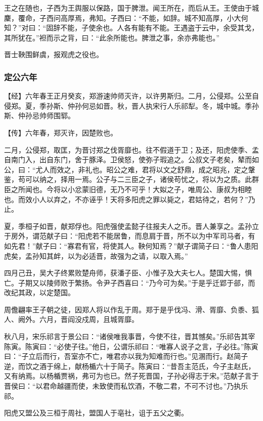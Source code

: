 \documentclass[]{article}
\begin{document}
王之在随也，子西为王舆服以保路，国于脾泄。闻王所在，而后从王。王使由于城麇，覆命，子西问高厚焉，弗知。子西曰：``不能，如辞。城不知高厚，小大何知？''对曰：``固辞不能，子使余也。人各有能有不能。王遇盗于云中，余受其戈，其所犹在。''袒而示之背，曰：``此余所能也。脾泄之事，余亦弗能也。''

晋士鞅围鲜虞，报观虎之役也。

\hypertarget{header-n2933}{%
\subsubsection{定公六年}\label{header-n2933}}

【经】六年春王正月癸亥，郑游速帅师灭许，以许男斯归。二月，公侵郑。公至自侵郑。夏，季孙斯、仲孙何忌如晋。秋，晋人执宋行人乐祁犁。冬，城中城。季孙斯、仲孙忌帅师围郓。

【传】六年春，郑灭许，因楚败也。

二月，公侵郑，取匡，为晋讨郑之伐胥靡也。往不假道于卫；及还，阳虎使季、孟自南门入，出自东门，舍于豚泽。卫侯怒，使弥子瑕追之。公叔文子老矣，辇而如公，曰：``尤人而效之，非礼也。昭公之难，君将以文之舒鼎，成之昭兆，定之鞶鉴，苟可以纳之，择用一焉。公子与二三臣之子，诸侯苟忧之，将以为之质。此群臣之所闻也。今将以小忿蒙旧德，无乃不可乎！大姒之子，唯周公、康叔为相睦也。而效小人以弃之，不亦诬乎！天将多阳虎之罪以毙之，君姑待之，若何？''乃止。

夏，季桓子如晋，献郑俘也。阳虎强使孟懿子往报夫人之币。晋人兼享之。孟孙立于房外，谓范献子曰：``阳虎若不能居鲁，而息肩于晋，所不以为中军司马者，有如先君！''献子曰：``寡君有官，将使其人。鞅何知焉？''献子谓简子曰：``鲁人患阳虎矣，孟孙知其衅，以为必适晋，故强为之请，以取入焉。''

四月己丑，吴大子终累败楚舟师，获潘子臣、小惟子及大夫七人。楚国大惕，惧亡。子期又以陵师败于繁扬。令尹子西喜曰：``乃今可为矣。''于是乎迁郢于郤，而改纪其政，以定楚国。

周儋翩率王子朝之徒，因郑人将以作乱于周。郑于是乎伐冯、滑、胥靡、负黍、狐人、阙外。六月，晋阎没戍周，且城胥靡。

秋八月，宋乐祁言于景公曰：``诸侯唯我事晋，今使不往，晋其憾矣。''乐祁告其宰陈寅。陈寅曰：``必使子往。''他日，公谓乐祁曰：``唯寡人说子之言，子必往。''陈寅曰：``子立后而行，吾室亦不亡，唯君亦以我为知难而行也。''见溷而行。赵简子逆，而饮之酒于绵上，献杨楯六十于简子。陈寅曰：``昔吾主范氏，今子主赵氏，又有纳焉。以杨楯贾祸，弗可为也已。然子死晋国，子孙必得志于宋。''范献子言于晋侯曰：``以君命越疆而使，未致使而私饮酒，不敬二君，不可不讨也。''乃执乐祁。

阳虎又盟公及三桓于周社，盟国人于亳社，诅于五父之衢。
\end{document}
